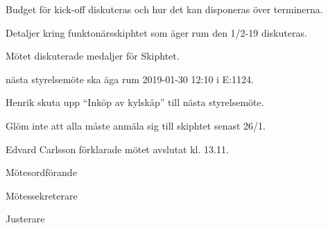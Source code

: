 \documentclass[10pt]{article}
\def\mo{Edvard Carlsson}
\def\ms{Sonja Kenari}
\def\ji{Henrik Ramström}
\begin{document}
\begin{paragrafer}
Budget för kick-off diskuteras och hur det kan disponeras över terminerna.

Detaljer kring funktonärsskiphtet som äger rum den 1/2-19 diskuteras. 

Mötet diskuterade medaljer för Skiphtet.

\Mba nästa styrelsemöte ska äga rum 2019-01-30 12:10 i E:1124.

Henrik \ypa skuta upp ``Inköp av kylskåp'' till nästa styrelsemöte.

\Mbaby

Glöm inte att alla måste anmäla sig till skiphtet senast 26/1.


{\mo} förklarade mötet avslutat kl. 13.11.
\end{paragrafer}

\hidesignfoot
\begin{signatures}{3}
\signature{\mo}{Mötesordförande}
\signature{\ms}{Mötessekreterare}
\signature{\ji}{Justerare}
\end{signatures}
\end{document}
